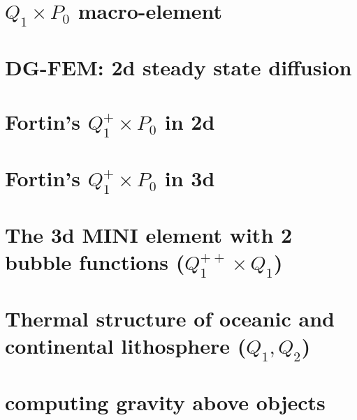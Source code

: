 \documentclass[a4paper,11pt]{report}
\begin{document}
\chapter{$Q_1\times P_0$ macro-element \label{f78}} %

\chapter{DG-FEM: 2d steady state diffusion \label{f79}} %

\chapter{Fortin's $Q_1^+\times P_0$ in 2d \label{f80}} %

\chapter{Fortin's $Q_1^+\times P_0$ in 3d \label{f81}} %

\chapter{The 3d MINI element with 2 bubble functions ($Q_1^{++}\times Q_1$) \label{f82}} %

\chapter{Thermal structure of oceanic and continental lithosphere ($Q_1,Q_2$)\label{f83}} %

\chapter{computing gravity above objects \label{f84}} %
\end{document}
